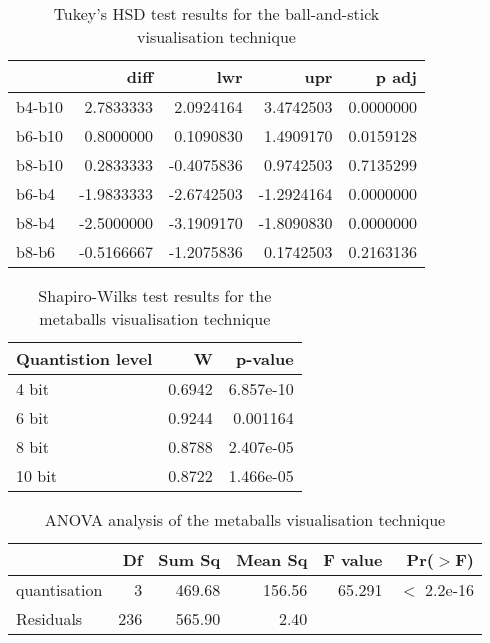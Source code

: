 \begin{table}
  \begin{tabular}{ | l | r | r | r | r |}
  \hline
         &       diff &        lwr &        upr &     p adj  \\ \hline
  b4-b10 &  2.7833333 &  2.0924164 &  3.4742503 & 0.0000000  \\ \hline
  b6-b10 &  0.8000000 &  0.1090830 &  1.4909170 & 0.0159128  \\ \hline
  b8-b10 &  0.2833333 & -0.4075836 &  0.9742503 & 0.7135299  \\ \hline
  b6-b4  & -1.9833333 & -2.6742503 & -1.2924164 & 0.0000000  \\ \hline
  b8-b4  & -2.5000000 & -3.1909170 & -1.8090830 & 0.0000000  \\ \hline
  b8-b6  & -0.5166667 & -1.2075836 &  0.1742503 & 0.2163136  \\ \hline
  \end{tabular}
  \caption{Tukey's HSD test results for the ball-and-stick visualisation
  technique}
  \label{tab:appendix_ballstick_tukeyhsd}
\end{table}


\begin{table}
  \begin{tabular}{ | l | r | r | }
  \hline
  Quantistion level &      W &   p-value  \\ \hline
  4 bit             & 0.6942 & 6.857e-10  \\ \hline
  6 bit             & 0.9244 &  0.001164  \\ \hline
  8 bit             & 0.8788 & 2.407e-05  \\ \hline
  10 bit            & 0.8722 & 1.466e-05  \\ \hline
  \end{tabular}
  \caption{Shapiro-Wilks test results for the metaballs visualisation
  technique}
  \label{tab:appendix_metaballs_normality}
\end{table}


\begin{table}
  \begin{tabular}{ | l | r | r | r | r | r | }
  \hline
               &  Df & Sum Sq & Mean Sq & F value &    Pr($>$F)  \\ \hline
  quantisation &   3 & 469.68 &  156.56 &  65.291 & $<$ 2.2e-16  \\ \hline
  Residuals    & 236 & 565.90 &    2.40 &         &              \\ \hline
  \end{tabular}
  \caption{ANOVA analysis of the metaballs visualisation technique}
  \label{tab:appendix_metaballs_anova}
\end{table}


